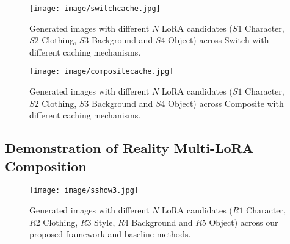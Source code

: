 \begin{figure}[H]
\begin{center}
\texttt{[image: image/switchcache.jpg]}
\end{center}
\caption{Generated images with different $N$ LoRA candidates ($S1$ Character, $S2$ Clothing, $S3$ Background and $S4$ Object) across Switch with different caching mechanisms.}
\label{c5}
\end{figure}

\begin{figure}[H]
\begin{center}
\texttt{[image: image/compositecache.jpg]}
\end{center}
\caption{Generated images with different $N$ LoRA candidates ($S1$ Character, $S2$ Clothing, $S3$ Background and $S4$ Object) across Composite with different caching mechanisms.}
\label{c6}
\end{figure}

\subsection{Demonstration of Reality Multi-LoRA Composition}
\begin{figure}[H]
\begin{center}
\texttt{[image: image/sshow3.jpg]}
\end{center}
\caption{Generated images with different $N$ LoRA candidates ($R1$ Character, $R2$ Clothing, $R3$ Style, $R4$ Background and $R5$ Object) across our proposed framework and baseline methods. }
\label{c7}
\end{figure}

\newpage
